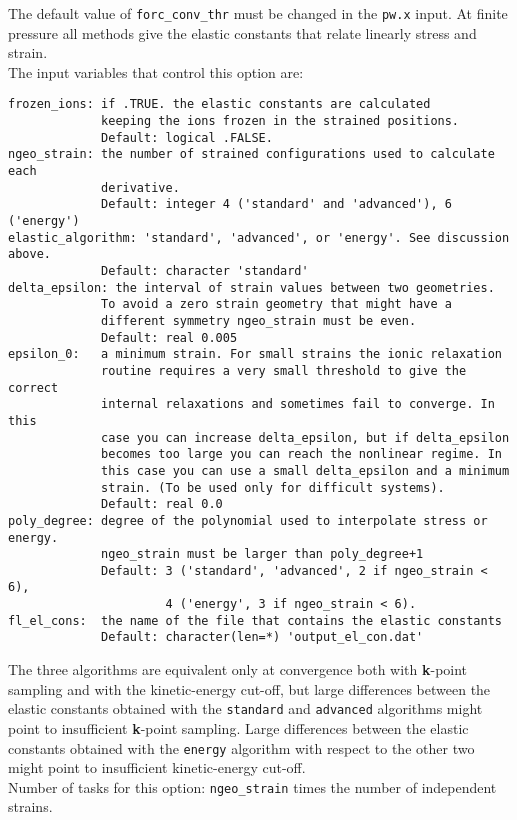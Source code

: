 \documentclass[12pt,a4paper]{article}
\begin{document}
The default value of \texttt{forc\_conv\_thr} must be changed in the 
\texttt{pw.x} input.
At finite pressure all methods give the elastic constants that
relate linearly stress and strain. \\
The input variables that control this option are:
\begin{verbatim}
frozen_ions: if .TRUE. the elastic constants are calculated 
             keeping the ions frozen in the strained positions. 
             Default: logical .FALSE.
ngeo_strain: the number of strained configurations used to calculate each
             derivative. 
             Default: integer 4 ('standard' and 'advanced'), 6 ('energy')
elastic_algorithm: 'standard', 'advanced', or 'energy'. See discussion above.
             Default: character 'standard' 
delta_epsilon: the interval of strain values between two geometries.
             To avoid a zero strain geometry that might have a
             different symmetry ngeo_strain must be even.
             Default: real 0.005
epsilon_0:   a minimum strain. For small strains the ionic relaxation 
             routine requires a very small threshold to give the correct 
             internal relaxations and sometimes fail to converge. In this 
             case you can increase delta_epsilon, but if delta_epsilon 
             becomes too large you can reach the nonlinear regime. In 
             this case you can use a small delta_epsilon and a minimum 
             strain. (To be used only for difficult systems).
             Default: real 0.0
poly_degree: degree of the polynomial used to interpolate stress or energy.
             ngeo_strain must be larger than poly_degree+1
             Default: 3 ('standard', 'advanced', 2 if ngeo_strain < 6), 
                      4 ('energy', 3 if ngeo_strain < 6).
fl_el_cons:  the name of the file that contains the elastic constants
             Default: character(len=*) 'output_el_con.dat'
\end{verbatim}
The three algorithms are equivalent only at convergence both with
{\bf k}-point sampling and with the kinetic-energy cut-off, but 
large differences between the elastic constants obtained with the 
\texttt{standard} and \texttt{advanced} algorithms might point to 
insufficient {\bf k}-point sampling. Large differences between the 
elastic constants obtained with the \texttt{energy} algorithm with respect 
to the other two might point to insufficient kinetic-energy cut-off. \\
Number of tasks for this option: \texttt{ngeo\_strain} times the number of
independent strains. \\
\end{document}
